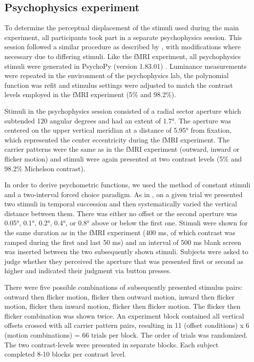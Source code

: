 \subsection{Psychophysics experiment}
To determine the perceptual displacement of the stimuli used during the main experiment, all participants took part in a separate psychophysics session. This session followed a similar procedure as described by \cite{Harvey2016}, with modifications where necessary due to differing stimuli. Like the fMRI experiment, all psychophysics stimuli were generated in PsychoPy (version 1.83.01) \parencite{Peirce2007,Peirce2008}. Luminance measurements were repeated in the environment of the psychophysics lab, the polynomial function was refit and stimulus settings were adjusted to match the contrast levels employed in the fMRI experiment (5\% and 98.2\%).

Stimuli in the psychophysics session consisted of a radial sector aperture which subtended 120 angular degrees and had an extent of 1.7°. The aperture was centered on the upper vertical meridian at a distance of 5.95° from fixation, which represented the center eccentricity during the fMRI experiment. The carrier patterns were the same as in the fMRI experiment (outward, inward or flicker motion) and stimuli were again presented at two contrast levels (5\% and 98.2\% Michelson contrast).

In order to derive psychometric functions, we used the method of constant stimuli and a two-interval forced choice paradigm. As in \cite{Harvey2016}, on a given trial we presented two stimuli in temporal succession and then systematically varied the vertical distance between them. There was either no offset or the second aperture was 0.05°, 0.1°, 0.2°, 0.4°, or 0.8° above or below the first one. Stimuli were shown for the same duration as in the fMRI experiment (400 ms, of which contrast was ramped during the first and last 50 ms) and an interval of 500 ms blank screen was inserted between the two subsequently shown stimuli. Subjects were asked to judge whether they perceived the  aperture that was presented first or second as higher and indicated their judgment via button presses.

There were five possible combinations of subsequently presented stimulus pairs: outward then flicker motion, flicker then outward motion, inward then flicker motion, flicker then inward motion, flicker then flicker motion. The flicker then flicker combination was shown twice. An experiment block contained all vertical offsets crossed with all carrier pattern pairs, resulting in 11 (offset conditions) x 6 (motion combinations) = 66 trials per block. The order of trials was randomized. The two contrast-levels were presented in separate blocks. Each subject completed 8-10 blocks per contrast level.


